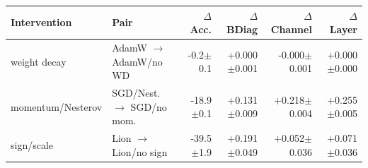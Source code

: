 \begin{tabular}{llrrrr}
\toprule
Intervention & Pair & $\Delta$Acc. & $\Delta$BDiag & $\Delta$Channel & $\Delta$Layer \\
\midrule
weight decay & AdamW $\to$ AdamW/no WD & -0.2$\pm$0.1 & +0.000$\pm$0.001 & -0.000$\pm$0.001 & +0.000$\pm$0.000 \\
momentum/Nesterov & SGD/Nest. $\to$ SGD/no mom. & -18.9$\pm$0.1 & +0.131$\pm$0.009 & +0.218$\pm$0.004 & +0.255$\pm$0.005 \\
sign/scale & Lion $\to$ Lion/no sign & -39.5$\pm$1.9 & +0.191$\pm$0.049 & +0.052$\pm$0.036 & +0.071$\pm$0.036 \\
\bottomrule
\end{tabular}
